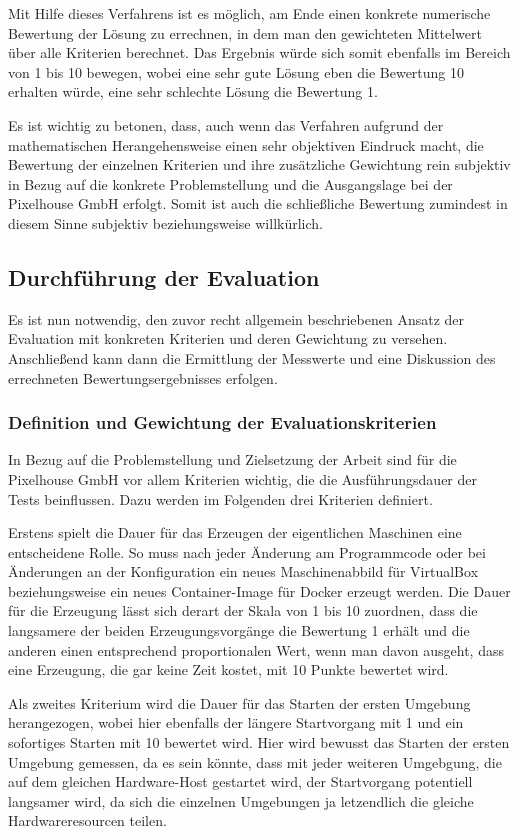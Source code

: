 Mit Hilfe dieses Verfahrens ist es möglich, am Ende einen konkrete numerische Bewertung der Lösung zu errechnen, in dem man den gewichteten Mittelwert über alle Kriterien berechnet. Das Ergebnis würde sich somit ebenfalls im Bereich von 1 bis 10 bewegen, wobei eine sehr gute Lösung eben die Bewertung 10 erhalten würde, eine sehr schlechte Lösung die Bewertung 1.

Es ist wichtig zu betonen, dass, auch wenn das Verfahren aufgrund der mathematischen Herangehensweise einen sehr objektiven Eindruck macht, die Bewertung der einzelnen Kriterien und ihre zusätzliche Gewichtung rein subjektiv in Bezug auf die konkrete Problemstellung und die Ausgangslage bei der Pixelhouse GmbH erfolgt. Somit ist auch die schließliche Bewertung zumindest in diesem Sinne subjektiv beziehungsweise willkürlich.

\subsection{Durchführung der Evaluation}

Es ist nun notwendig, den zuvor recht allgemein beschriebenen Ansatz der Evaluation mit konkreten Kriterien und deren Gewichtung zu versehen. Anschließend kann dann die Ermittlung der Messwerte und eine Diskussion des errechneten Bewertungsergebnisses erfolgen.

\subsubsection{Definition und Gewichtung der Evaluationskriterien}

In Bezug auf die Problemstellung und Zielsetzung der Arbeit sind für die Pixelhouse GmbH vor allem Kriterien wichtig, die die Ausführungsdauer der Tests beinflussen. Dazu werden im Folgenden drei Kriterien definiert.

Erstens spielt die Dauer für das Erzeugen der eigentlichen Maschinen eine entscheidene Rolle. So muss nach jeder Änderung am Programmcode oder bei Änderungen an der Konfiguration ein neues Maschinenabbild für VirtualBox beziehungsweise ein neues Container-Image für Docker erzeugt werden. Die Dauer für die Erzeugung lässt sich derart der Skala von 1 bis 10 zuordnen, dass die langsamere der beiden Erzeugungsvorgänge die Bewertung 1 erhält und die anderen einen entsprechend proportionalen Wert, wenn man davon ausgeht, dass eine Erzeugung, die gar keine Zeit kostet, mit 10 Punkte bewertet wird.

Als zweites Kriterium wird die Dauer für das Starten der ersten Umgebung herangezogen, wobei hier ebenfalls der längere Startvorgang mit 1 und ein sofortiges Starten mit 10 bewertet wird. Hier wird bewusst das Starten der ersten Umgebung gemessen, da es sein könnte, dass mit jeder weiteren Umgebgung, die auf dem gleichen Hardware-Host gestartet wird, der Startvorgang potentiell langsamer wird, da sich die einzelnen Umgebungen ja letzendlich die gleiche Hardwareresourcen teilen.

